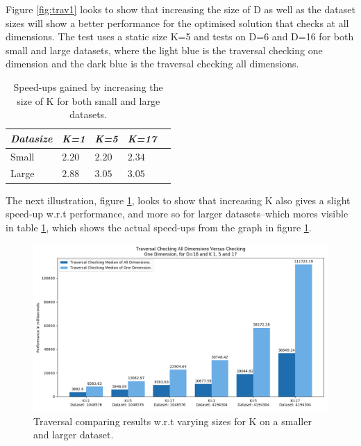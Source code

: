 Figure \ref{fig:trav1} looks to show that increasing the size of D as well as the dataset sizes will show a better performance for the optimised solution that checks at all dimensions. The test uses a static size K=5 and tests on D=6 and D=16 for both small and large datasets, where the light blue is the traversal checking one dimension and the dark blue is the traversal checking all dimensions. 



\begin{table}[H]
\centering
\begin{tabular}{@{} *5l @{}}    \toprule
\emph{Datasize} & \emph{K=1} & \emph{K=5} & \emph{K=17} &  \\\midrule
Small     & $2.20$  & $2.20$  & $2.34$  &   \\ 
Large     & $2.88$ & $3.05$ & $3.05$ & \\ \bottomrule
 \hline
\end{tabular}
\caption{Speed-ups gained by increasing the size of K for both small and large datasets.}
\label{tab:travk}
\end{table}

The next illustration, figure \ref{fig:trav2}, looks to show that increasing K also gives a slight speed-up w.r.t performance, and more so for larger datasets--which mores visible in table \ref{tab:travk}, which shows the actual speed-ups from the graph in figure \ref{fig:trav2}.




\begin{figure}[H]
\centering
\includegraphics[width=1\textwidth]{pics/plot-figs/trav-d16.png}
\caption{Traversal comparing results w.r.t varying sizes for K on a smaller and larger dataset.}
\label{fig:trav2}
\end{figure}


